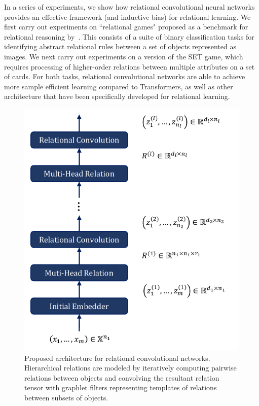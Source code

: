 In a series of experiments, we show how relational convolutional neural networks provides an effective framework (and inductive bias) for relational learning. We first carry out experiments on ``relational games" proposed as a benchmark for relational reasoning by~\citep{shanahanExplicitlyRelationalNeural}. This consists of a suite of binary classification tasks for identifying abstract relational rules between a set of objects represented as images. We next carry out experiments on a version of the SET game, which requires processing of  higher-order relations between multiple attributes on a set of cards. For both tasks, relational convolutional networks are able to achieve more sample efficient learning compared to Transformers, as well as other architecture that have been specifically developed for relational learning.

\begin{figure}
    \centering
    \includegraphics[width=.5\textwidth]{figs/relconv_architecture.pdf}
    \caption{Proposed architecture for relational convolutional networks. Hierarchical relations are modeled by iteratively computing pairwise relations between objects and convolving the resultant relation tensor with graphlet filters representing templates of relations between subsets of objects.
    }\label{fig:relconv_architecture}
\end{figure}

